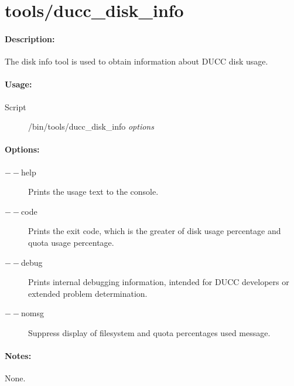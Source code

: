 % 
% 
% 
% 
\ifpdf
\else
{}
\fi
    \section{tools/ducc\_disk\_info}
    \label{sec:cli.tools-ducc-disk-info}    

  \paragraph{Description:}
    The disk info tool is used to obtain information about DUCC disk usage. 
    
  \paragraph{Usage:}
    \begin{description}
    \item[Script] \ducchome/bin/tools/ducc\_disk\_info {\em options}
    \end{description}
    
    \paragraph{Options:}
    \begin{description}
    	\item[$--$help]
          Prints the usage text to the console. 
        \item[$--$code]
          Prints the exit code, which is the greater of disk usage percentage and quota usage percentage. 
        \item[$--$debug ]          
          Prints internal debugging information, intended for DUCC developers or extended problem determination.
        \item[$--$nomsg ]          
          Suppress display of filesystem and quota percentages used message.                                                                                               
     \end{description}
        
    \paragraph{Notes:}
    None.
    